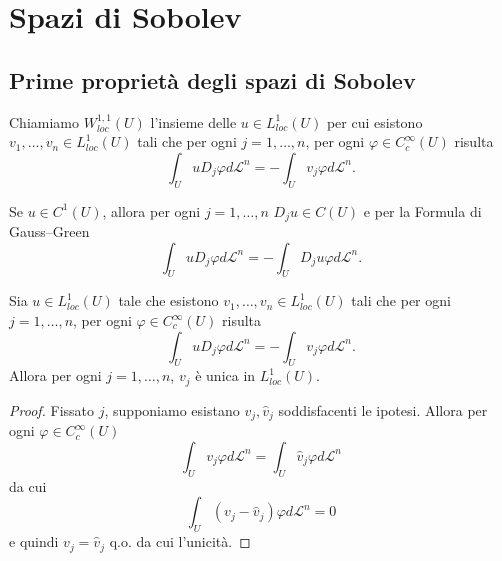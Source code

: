 

\chapter{Spazi di Sobolev}
\section{Prime proprietà degli spazi di Sobolev}
\begin{definizione}
	Chiamiamo $W^{1,1}_{loc}(U)$ l’insieme delle $u \in L^{1}_{loc}(U)$ per cui esistono $v_{1},\dots,v_{n} \in L^{1}_{loc}(U)$ tali che per ogni $j = 1,\dots, n$, per ogni $\varphi \in C^{\infty}_{c}(U)$ risulta
	\[ \int_{U} uD_{j}\varphi d\mathcal{L}^n = - \int_{U}v_{j}\varphi d\mathcal{L}^n.\]
\end{definizione}
\begin{osservazione}\label{derivatadebolecasoregolare}
	Se $u \in C^{1}(U)$, allora per ogni $j = 1,\dots, n$ $D_{j}u \in C(U)$ e per la Formula di Gauss--Green
	\[ \int_{U} uD_{j}\varphi d\mathcal{L}^n = - \int_{U}D_{j}u\varphi d\mathcal{L}^n.\]
\end{osservazione}
\begin{proposizione}
	Sia $u \in L^{1}_{loc}(U)$ tale che esistono $v_{1},\dots,v_{n} \in L^{1}_{loc}(U)$ tali che per ogni $j = 1,\dots, n$, per ogni $\varphi \in C^{\infty}_{c}(U)$ risulta
	\[ \int_{U} uD_{j}\varphi d\mathcal{L}^n = - \int_{U}v_{j}\varphi d\mathcal{L}^n.\]
	Allora per ogni $j = 1,\dots, n$, $v_{j}$ è unica in $L^{1}_{loc}(U)$.
\end{proposizione}
\begin{proof}
	Fissato $j$, supponiamo esistano $v_{j}, \hat{v}_{j}$ soddisfacenti le ipotesi. Allora per ogni $\varphi \in C^{\infty}_{c}(U)$
	\[ \int_{U}v_{j}\varphi d\mathcal{L}^n = \int_{U}\hat{v}_{j}\varphi d\mathcal{L}^n \]
	da cui 
	\[ \int_{U}(v_{j} - \hat{v}_{j})\varphi d\mathcal{L}^n = 0 \]
	e quindi $v_{j} = \hat{v}_{j}$ q.o. da cui l'unicità.
\end{proof}

